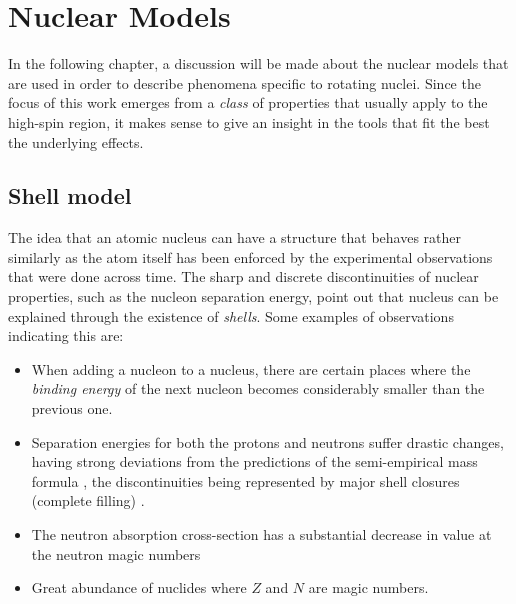 \chapter{Nuclear Models}
\label{chapter-3}

In the following chapter, a discussion will be made about the nuclear models that are used in order to describe phenomena specific to rotating nuclei. Since the focus of this work emerges from a \emph{class} of properties that usually apply to the high-spin region, it makes sense to give an insight in the tools that fit the best the underlying effects.

\section{Shell model}

The idea that an atomic nucleus can have a structure that behaves rather similarly as the atom itself has been enforced by the experimental observations that were done across time. The sharp and discrete discontinuities of nuclear properties, such as the nucleon separation energy, point out that nucleus can be explained through the existence of \emph{shells}. Some examples of observations indicating this are:
\begin{itemize}
    \item When adding a nucleon to a nucleus, there are certain places where the \emph{binding energy} of the next nucleon becomes considerably smaller than the previous one. 
    \item Separation energies for both the protons and neutrons suffer drastic changes, having strong deviations from the predictions of the semi-empirical mass formula \cite{weizsacker1935theorie}, the discontinuities being represented by major shell closures (complete filling) \cite{krane1991introductory}.
    \item The neutron absorption cross-section has a substantial decrease in value at the neutron magic numbers
    \item Great abundance of nuclides where $Z$ and $N$ are magic numbers.
\end{itemize}

